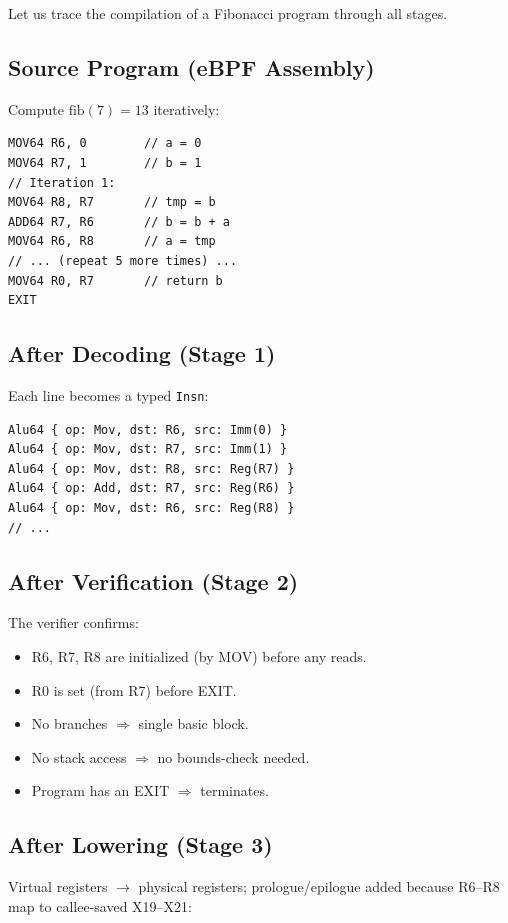 \documentclass[11pt,letterpaper]{article}
\begin{document}
Let us trace the compilation of a Fibonacci program through all stages.

\subsection{Source Program (eBPF Assembly)}

Compute $\text{fib}(7) = 13$ iteratively:
\begin{lstlisting}[style=asm]
MOV64 R6, 0        // a = 0
MOV64 R7, 1        // b = 1
// Iteration 1:
MOV64 R8, R7       // tmp = b
ADD64 R7, R6       // b = b + a
MOV64 R6, R8       // a = tmp
// ... (repeat 5 more times) ...
MOV64 R0, R7       // return b
EXIT
\end{lstlisting}

\subsection{After Decoding (Stage 1)}

Each line becomes a typed \texttt{Insn}:
\begin{lstlisting}[style=rust]
Alu64 { op: Mov, dst: R6, src: Imm(0) }
Alu64 { op: Mov, dst: R7, src: Imm(1) }
Alu64 { op: Mov, dst: R8, src: Reg(R7) }
Alu64 { op: Add, dst: R7, src: Reg(R6) }
Alu64 { op: Mov, dst: R6, src: Reg(R8) }
// ...
\end{lstlisting}

\subsection{After Verification (Stage 2)}

The verifier confirms:
\begin{itemize}
    \item R6, R7, R8 are initialized (by MOV) before any reads.
    \item R0 is set (from R7) before EXIT.
    \item No branches $\Rightarrow$ single basic block.
    \item No stack access $\Rightarrow$ no bounds-check needed.
    \item Program has an EXIT $\Rightarrow$ terminates.
\end{itemize}

\subsection{After Lowering (Stage 3)}

Virtual registers $\to$ physical registers; prologue/epilogue added because R6--R8 map to callee-saved X19--X21:
\end{document}
